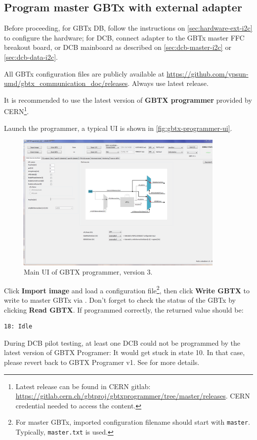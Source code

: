 \subsection{Program master GBTx with external \itwoc adapter}
Before proceeding, for GBTx DB, follow the instructions on
\autoref{sec:hardware-ext-i2c} to configure the hardware;
for DCB, connect \itwoc adapter to the GBTx master FFC breakout board, or DCB
mainboard as described on \autoref{sec:dcb-master-i2c} or
\autoref{sec:dcb-data-i2c}.

All GBTx configuration files are publicly available at
\url{https://github.com/ypsun-umd/gbtx_communication_doc/releases}.
Always use latest release.

It is recommended to use the latest version of \textbf{GBTX programmer} provided
by CERN\footnote{
    Latest release can be found in CERN gitlab:
    \url{https://gitlab.cern.ch/gbtproj/gbtxprogrammer/tree/master/releases}.
    CERN credential needed to access the content.
}.

Launch the programmer, a typical UI is shown in
\autoref{fig:gbtx-programmer-ui}.

\begin{figure}[!ht]
    \centering
    \includegraphics[width=0.9\textwidth]{res/gbtx_programmer_v3_ui.png}
    \caption{Main UI of GBTX programmer, version 3.}
    \label{fig:gbtx-programmer-ui}
\end{figure}

Click \textbf{Import image} and load a configuration file\footnote{
    For master GBTx, imported configuration filename should start with
    \texttt{master}. Typically, \texttt{master.txt} is used.
},
then click \textbf{Write GBTX} to write to master GBTx via \itwoc.
Don't forget to check the status of the GBTx by clicking \textbf{Read GBTX}.
If programmed correctly, the returned value should be:

\begin{lstlisting}
18: Idle
\end{lstlisting}

\begin{leftbar}
    During DCB pilot testing, at least one DCB could not be programmed by the
    latest version of GBTX Programer: It would get stuck in state 10.
    In that case, please revert back to GBTX Programer v1.
    See  for more details.
\end{leftbar}
